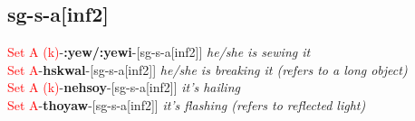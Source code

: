 \documentclass[oneside,openany]{book}%
\begin{document}
\subsection*{sg-s-a[inf2]}%
\textcolor{Red}{Set A (k)}{-}\textbf{:yew/:yewi}{-}[sg-s-a[inf2]] \textit{ he/she is sewing it} \\%
\textcolor{Red}{Set A}{-}\textbf{hskwal}{-}[sg-s-a[inf2]] \textit{ he/she is breaking it (refers to a long object)} \\%
\textcolor{Red}{Set A (k)}{-}\textbf{nehsoy}{-}[sg-s-a[inf2]] \textit{ it's hailing} \\%
\textcolor{Red}{Set A}{-}\textbf{thoyaw}{-}[sg-s-a[inf2]] \textit{ it's flashing (refers to reflected light)} \\%
\vspace{1em}%
\needspace{1in}%
\end{document}
